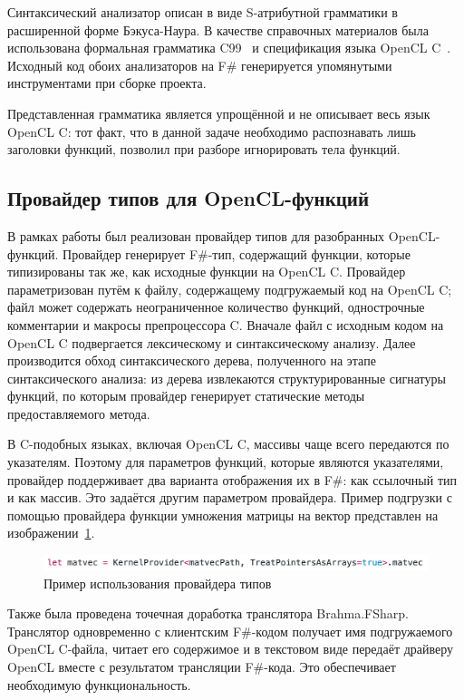 Синтаксический анализатор описан в виде S-атрибутной грамматики в расширенной форме Бэкуса-Наура. В качестве справочных материалов была использована формальная грамматика C99~\cite{C99} и спецификация языка OpenCL C~\cite{OpenCL_C}. Исходный код обоих анализаторов на F\# генерируется упомянутыми инструментами при сборке проекта.

Представленная грамматика является упрощённой и не описывает весь язык OpenCL C: тот факт, что в данной задаче необходимо распознавать лишь заголовки функций, позволил при разборе игнорировать тела функций.

\subsection{Провайдер типов для OpenCL-функций}
В рамках работы был реализован провайдер типов для разобранных OpenCL-функций. Провайдер генерирует F\#-тип, содержащий функции, которые типизированы так же, как исходные функции на OpenCL C. Провайдер параметризован путём к файлу, содержащему подгружаемый код на OpenCL C; файл может содержать неограниченное количество функций, однострочные комментарии и макросы препроцессора C. Вначале файл с исходным кодом на OpenCL C подвергается лексическому и синтаксическому анализу. Далее производится обход синтаксического дерева, полученного на этапе синтаксического анализа: из дерева извлекаются структурированные сигнатуры функций, по которым провайдер генерирует статические методы предоставляемого метода.

В C-подобных языках, включая OpenCL C, массивы чаще всего передаются по указателям. Поэтому для параметров функций, которые являются указателями, провайдер поддерживает два варианта отображения их в F\#: как ссылочный тип и как массив. Это задаётся другим параметром провайдера. Пример подгрузки с помощью провайдера функции умножения матрицы на вектор представлен на изображении~\ref{tp_call_example}.

\begin{figure}[h]
\centering
\includegraphics[width=\textwidth]{Smirenko/courseworkpictures/tp-call.png}
\caption{Пример использования провайдера типов}
\label{tp_call_example}
\end{figure}

Также была проведена точечная доработка транслятора Brahma.FSharp. Транслятор одновременно с клиентским F\#-кодом получает имя подгружаемого OpenCL C-файла, читает его содержимое и в текстовом виде передаёт драйверу OpenCL вместе с результатом трансляции F\#-кода. Это обеспечивает необходимую функциональность.

